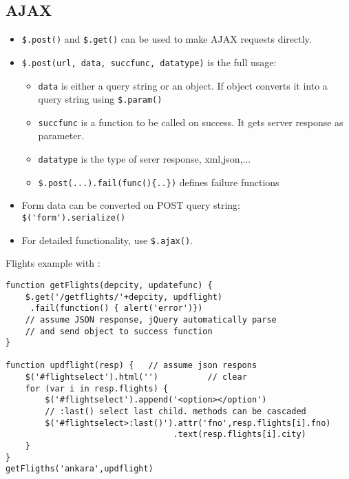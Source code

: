 \documentclass[trans,compress,xcolor=table]{beamer}
\begin{document}
\subsection*{AJAX}
\begin{frame}[fragile]
\begin{itemize}
\item \lstinline!$.post()! and \lstinline!$.get()! can be used to
	make AJAX requests directly.
\item \lstinline!$.post(url, data, succfunc, datatype)! is the full usage:\\
\begin{itemize}
\item \lstinline!data! is either a query string or an object. If object
	 converts it into a query string using 
	\lstinline!$.param()!
\item \lstinline!succfunc! is a function to be called on success. It gets
	server response as parameter.
\item \lstinline!datatype! is the type of serer response, xml,json,...
\item \lstinline!$.post(...).fail(func(){..})! defines failure functions
\end{itemize}
\item Form data can be converted on POST query string:\\
	\lstinline!$('form').serialize()!
\item For detailed functionality, use \lstinline!$.ajax()!.
\end{itemize}
\end{frame}

\begin{frame}[fragile]
Flights example with :
\begin{lstlisting}
function getFlights(depcity, updatefunc) {
    $.get('/getflights/'+depcity, updflight)
     .fail(function() { alert('error')})
    // assume JSON response, jQuery automatically parse
    // and send object to success function
}

function updflight(resp) {   // assume json respons
    $('#flightselect').html('')          // clear
    for (var i in resp.flights) {
        $('#flightselect').append('<option></option')
        // :last() select last child. methods can be cascaded
        $('#flightselect>:last()').attr('fno',resp.flights[i].fno)
                                  .text(resp.flights[i].city)
    }
}
getFligths('ankara',updflight)
\end{lstlisting}
\end{frame}
\end{document}
